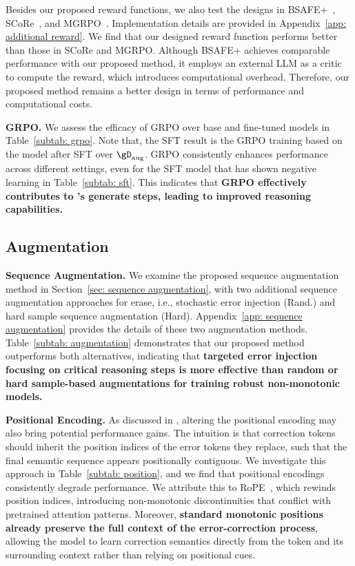 Besides our proposed reward functions, we also test the designs in BSAFE+~\cite{selreinforcement}, SCoRe~\cite{kumar2024training}, and MGRPO~\cite{ding2025multi}. 
Implementation details are provided in Appendix~\ref{app: additional reward}.
We find that our designed reward function performs better than those in SCoRe and MGRPO. 
Although BSAFE+ achieves comparable performance with our proposed method, it employs an external LLM as a critic to compute the reward, which introduces computational overhead. 
Therefore, our proposed method remains a better design in terms of performance and computational costs.



\textbf{GRPO.} 
We assess the efficacy of GRPO over base and fine-tuned models in Table~\ref{subtab: grpo}.
Note that, the SFT result is the GRPO training based on the model after SFT over $\gD_\text{aug}$.
GRPO consistently enhances performance across different settings, even for the SFT model that has shown negative learning in Table~\ref{subtab: sft}.
This indicates that \textbf{GRPO effectively contributes to \modelname's generate steps, leading to improved reasoning capabilities.}

\subsection{Augmentation}

\textbf{Sequence Augmentation.}
We examine the proposed sequence augmentation method in Section~\ref{sec: sequence augmentation}, with two additional sequence augmentation approaches for erase, i.e., stochastic error injection (Rand.) and hard sample sequence augmentation (Hard).  
Appendix~\ref{app: sequence augmentation} provides the details of these two augmentation methods.
Table~\ref{subtab: augmentation} demonstrates that our proposed method outperforms both alternatives, indicating that \textbf{targeted error injection focusing on critical reasoning steps is more effective than random or hard sample-based augmentations for training robust non-monotonic models.}

\textbf{Positional Encoding.}
As discussed in \citet{cundy2023sequencematch}, altering the positional encoding may also bring potential performance gains.
The intuition is that correction tokens should inherit the position indices of the error tokens they replace, such that the final semantic sequence appears positionally contiguous.
We investigate this approach in Table~\ref{subtab: position}, and we find that positional encodings consistently degrade performance.
We attribute this to RoPE~\citep{su2024roformer}, which rewinds position indices, introducing non-monotonic discontinuities that conflict with pretrained attention patterns.
Moreover, \textbf{standard monotonic positions already preserve the full context of the error-correction process}, allowing the model to learn correction semantics directly from the \bk token and its surrounding context rather than relying on positional cues.